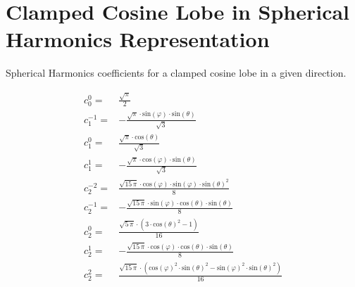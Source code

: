 \documentclass[thesis.tex]{subfiles}
\begin{document}
\newpage

\section{Clamped Cosine Lobe in Spherical Harmonics Representation} \label{chap:shcosinelobe}
Spherical Harmonics coefficients for a clamped cosine lobe in a given direction.

\begin{align}
c^0_0 =& \frac{\sqrt{\pi }}{2}\\
c^{-1}_1 =& -\frac{\sqrt{\pi }\cdot \mathrm{sin}\left( \varphi\right) \cdot \mathrm{sin}\left( \theta\right) }{\sqrt{3}}\\
c^0_1 =& \frac{\sqrt{\pi }\cdot \mathrm{cos}\left( \theta\right) }{\sqrt{3}}\\
c^1_1 =& -\frac{\sqrt{\pi }\cdot \mathrm{cos}\left( \varphi\right) \cdot \mathrm{sin}\left( \theta\right) }{\sqrt{3}}\\
c^{-2}_2 =& \frac{\sqrt{15 \, \pi}\cdot \mathrm{cos}\left( \varphi\right) \cdot \mathrm{sin}\left( \varphi\right) \cdot {{\mathrm{sin}\left( \theta\right) }^{2}}}{8}\\
c^{-1}_2 =& -\frac{\sqrt{15 \, \pi}\cdot \mathrm{sin}\left( \varphi\right) \cdot \mathrm{cos}\left( \theta\right) \cdot \mathrm{sin}\left( \theta\right) }{8}\\
c^0_2 =& \frac{\sqrt{5 \, \pi}\cdot \left( 3\cdot {{\mathrm{cos}\left( \theta\right) }^{2}}-1\right) }{16}\\
c^1_2 =& -\frac{\sqrt{15 \, \pi}\cdot \mathrm{cos}\left( \varphi\right) \cdot \mathrm{cos}\left( \theta\right) \cdot \mathrm{sin}\left( \theta\right) }{8}\\
c^2_2 =& \frac{\sqrt{15 \, \pi}\cdot \left( {{\mathrm{cos}\left( \varphi\right) }^{2}}\cdot {{\mathrm{sin}\left( \theta\right) }^{2}}-{{\mathrm{sin}\left( \varphi\right) }^{2}}\cdot {{\mathrm{sin}\left( \theta\right) }^{2}}\right) }{16}
\end{align}
\end{document}
